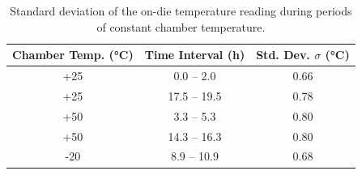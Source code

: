 \begin{table}
\centering
\caption{Standard deviation of the on-die temperature reading during periods of constant chamber temperature.}
\label{tab:std_table}
\begin{tabular}{S[table-format=+2.0] S[table-format=2.1] S[table-format=1.2]}
\toprule
{Chamber Temp. (\si{\celsius})} & {Time Interval (h)} & {Std. Dev. $\sigma$ (\si{\celsius})} \\
\midrule
+25 & {0.0 -- 2.0}   & 0.66 \\
+25 & {17.5 -- 19.5} & 0.78 \\
+50 & {3.3 -- 5.3}   & 0.80 \\
+50 & {14.3 -- 16.3} & 0.80 \\
-20 & {8.9 -- 10.9}  & 0.68 \\
\bottomrule
\end{tabular}
\end{table}



